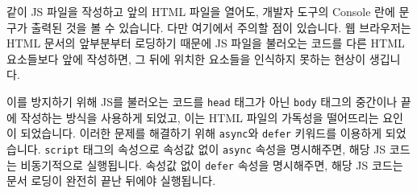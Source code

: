 \와 같이 JS 파일을 작성하고 앞의 HTML 파일을 열어도, 개발자 도구의 Console 란에 문구가 출력된 것을 볼 수 있습니다. 다만 여기에서 주의할 점이 있습니다. 웹 브라우저는 HTML 문서의 앞부분부터 로딩하기 때문에 JS 파일을 불러오는 코드를 다른 HTML 요소들보다 앞에 작성하면, 그 뒤에 위치한 요소들을 인식하지 못하는 현상이 생깁니다. 

이를 방지하기 위해 JS를 불러오는 코드를 \texttt{head} 태그가 아닌 \texttt{body} 태그의 중간이나 끝에 작성하는 방식을 사용하게 되었고, 이는 HTML 파일의 가독성을 떨어뜨리는 요인이 되었습니다. 이러한 문제를 해결하기 위해 \texttt{async}와 \texttt{defer} 키워드를 이용하게 되었습니다. \texttt{script} 태그의 속성으로 속성값 없이 \texttt{async} 속성을 명시해주면, 해당 JS 코드는 비동기적으로 실행됩니다. 속성값 없이 \texttt{defer} 속성을 명시해주면, 해당 JS 코드는 문서 로딩이 완전히 끝난 뒤에야 실행됩니다. 

